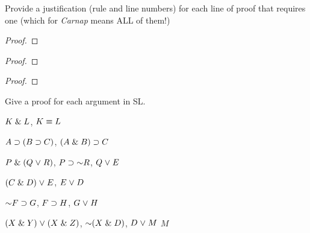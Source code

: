  
\clearpage



\practiceproblems

\solutions
\problempart
\label{pr.justifySLproof}
Provide a justification (rule and line numbers) for each line of proof that requires one {\color{black}(which for \textit{Carnap} means ALL of them!)}
\begin{multicols}{2}
\begin{proof}
 {}
 {}
\end{proof}

\begin{proof}
\open
\close
{}
\end{proof}

\begin{proof}
\open
	 {}
	\open
	\close
\close
{}
\end{proof}
\end{multicols}

\solutions
\problempart
\label{pr.solvedSLproofs}
Give a proof for each argument in SL.
\begin{earg}
\item $K\mathrel\& L$, \therefore $K\equiv L$
\item $A\supset (B\supset C)$, \therefore $(A\mathrel\& B)\supset C$
\item $P \mathrel\& (Q\mkern1mu\vee\mkern1mu R)$, $P\eif \enot R$, \therefore $Q\mkern1mu\vee\mkern1mu E$
\item $(C\mathrel\& D)\mkern1mu\vee\mkern1mu E$, \therefore $E\mkern1mu\vee\mkern1mu D$
\item $\enot F\eif G$, $F\supset H$, \therefore $G\mkern1mu\vee\mkern1mu H$
\item $(X\mathrel\& Y)\mkern1mu\vee\mkern1mu(X\mathrel\& Z)$, $\enot(X\eand D)$, $D\mkern1mu\vee\mkern1mu M$ \therefore $M$
\end{earg}

